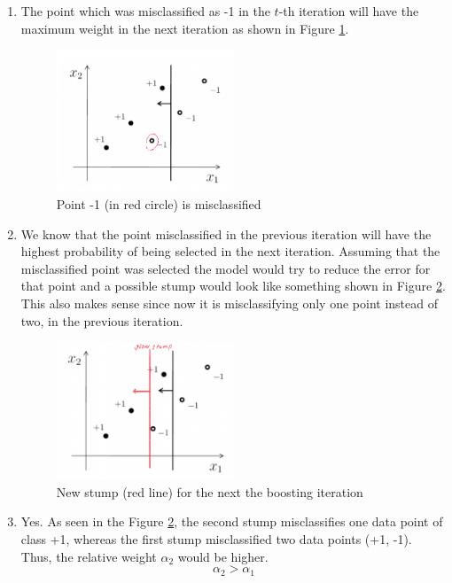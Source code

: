 \begin{enumerate}

	\item The point which was misclassified as -1 in the $t$-th iteration will have the maximum weight in the next iteration as shown in Figure \ref{fig:problem_3_a}.
	
		\begin{figure}
			\centering
			\includegraphics[width=0.5\textwidth]{images/problem_3_a.png}
			\caption{Point -1 (in red circle) is misclassified}
			\label{fig:problem_3_a}	
		\end{figure}
		
	\item We know that the point misclassified in the previous iteration will have the highest probability of being selected in the next iteration. Assuming that the misclassified point was selected the model would try to reduce the error for that point and a possible stump would look like something shown in Figure \ref{fig:problem_3_b}. This also makes sense since now it is misclassifying only one point instead of two, in the previous iteration.
		
		\begin{figure}[!ht]
			\centering
			\includegraphics[width=0.5\textwidth]{images/problem_3_b.png}
			\caption{New stump (red line) for the next the boosting iteration}
			\label{fig:problem_3_b}	
		\end{figure}
		
	\item Yes. As seen in the Figure \ref{fig:problem_3_b}, the second stump misclassifies one data point of class +1, whereas the first stump misclassified two data points (+1, -1). Thus, the relative weight $\alpha_{2}$ would be higher. $$\alpha_{2} > \alpha_{1}$$
        
\end{enumerate}
